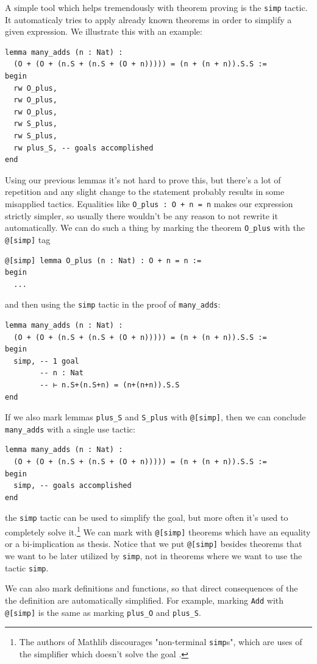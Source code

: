 \documentclass{book}
\theoremstyle{definition}
\theoremstyle{remark}
\theoremstyle{plain}
\begin{document}
A simple tool which helps tremendously with theorem proving is the \lstinline{simp} tactic.
It automaticaly tries to apply already known theorems in order to simplify a given expression.
We illustrate this with an example:
\begin{lstlisting}
lemma many_adds (n : Nat) :
  (O + (O + (n.S + (n.S + (O + n))))) = (n + (n + n)).S.S :=
begin
  rw O_plus,
  rw O_plus,
  rw O_plus,
  rw S_plus,
  rw S_plus,
  rw plus_S, -- goals accomplished
end
\end{lstlisting}
Using our previous lemmas it's not hard to prove this,
but there's a lot of repetition and any slight change to the statement probably results in some misapplied tactics.
Equalities like \lstinline{O_plus : O + n = n} makes our expression strictly simpler,
so usually there wouldn't be any reason to not rewrite it automatically.
We can do such a thing by marking the theorem \lstinline{O_plus} with the \lstinline{@[simp]} tag
\begin{lstlisting}
@[simp] lemma O_plus (n : Nat) : O + n = n :=
begin
  ...  
\end{lstlisting}
and then using the \lstinline{simp} tactic in the proof of \lstinline{many_adds}:
\begin{lstlisting}
lemma many_adds (n : Nat) :
  (O + (O + (n.S + (n.S + (O + n))))) = (n + (n + n)).S.S :=
begin
  simp, -- 1 goal
        -- n : Nat
        -- ⊢ n.S+(n.S+n) = (n+(n+n)).S.S
end
\end{lstlisting}
If we also mark lemmas \lstinline{plus_S} and \lstinline{S_plus} with \lstinline{@[simp]},
then we can conclude \lstinline{many_adds} with a single use tactic:
\begin{lstlisting}
lemma many_adds (n : Nat) :
  (O + (O + (n.S + (n.S + (O + n))))) = (n + (n + n)).S.S :=
begin
  simp, -- goals accomplished
end  
\end{lstlisting}
the \lstinline{simp} tactic can be used to simplify the goal,
but more often it's used to completely solve it.\footnote{The authors of Mathlib discourages
"non-terminal \lstinline{simp}s", which are uses of the simplifier which doesn't solve the goal \cite{mathlibsimp}.}
We can mark with \lstinline{@[simp]} theorems which have an equality or a bi-implication as thesis.
Notice that we put \lstinline{@[simp]} besides theorems that we want to be later utilized by \lstinline{simp},
not in theorems where we want to use the tactic \lstinline{simp}.

We can also mark definitions and functions,
so that direct consequences of the the definition are automatically simplified.
For example, marking \lstinline{Add} with \lstinline{@[simp]} is the same as marking \lstinline{plus_O} and \lstinline{plus_S}. 
\end{document}
